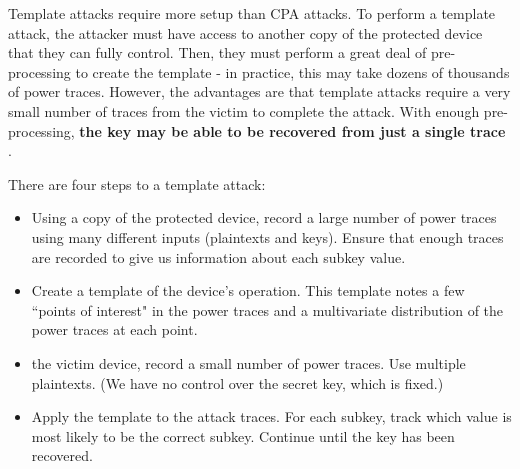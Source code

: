     Template attacks require more setup than CPA attacks. To perform a template
    attack, the attacker must have access to another copy of the protected
    device that they can fully control. Then, they must perform a great deal of
    pre-processing to create the template - in practice, this may take dozens of
    thousands of power traces. However, the advantages are that template attacks
    require a very small number of traces from the victim to complete the
    attack. With enough pre-processing, \textbf{the key may be able to be
    recovered from just a single trace} .
    
    
    There are four steps to a template attack:
    \begin{itemize}
      \item Using a copy of the protected device, record a large number of power
      traces using many different inputs (plaintexts and keys). Ensure that
      enough traces are recorded to give us information about each subkey value.
      \item Create a template of the device's operation. This template notes a
      few ``points of interest" in the power traces and a multivariate
      distribution of the power traces at each point.
      \item the victim device, record a small number of power traces. Use
      multiple plaintexts. (We have no control over the secret key, which is
      fixed.)
      \item Apply the template to the attack traces. For each subkey, track
      which value is most likely to be the correct subkey. Continue until the
      key has been recovered.
    \end{itemize}
    
